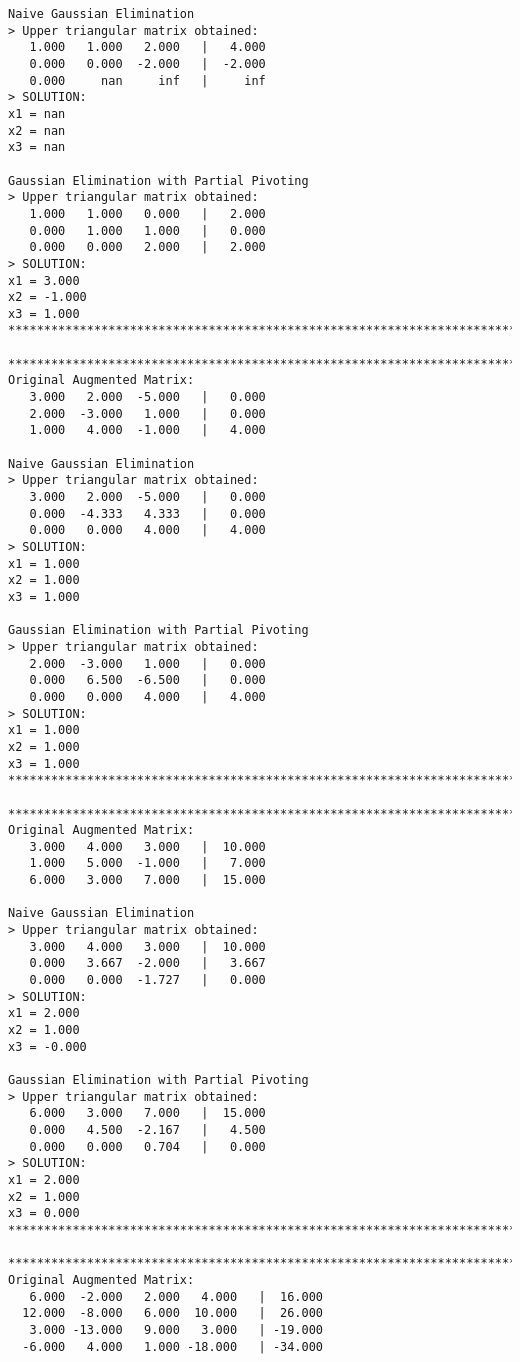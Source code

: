 \documentclass[letterpaper,10pt,titlepage]{report}
\begin{document}
\begin{verbatim}
Naive Gaussian Elimination
> Upper triangular matrix obtained:
   1.000   1.000   2.000   |   4.000
   0.000   0.000  -2.000   |  -2.000
   0.000     nan     inf   |     inf
> SOLUTION:
x1 = nan
x2 = nan
x3 = nan

Gaussian Elimination with Partial Pivoting
> Upper triangular matrix obtained:
   1.000   1.000   0.000   |   2.000
   0.000   1.000   1.000   |   0.000
   0.000   0.000   2.000   |   2.000
> SOLUTION:
x1 = 3.000
x2 = -1.000
x3 = 1.000
********************************************************************************

********************************************************************************
Original Augmented Matrix:
   3.000   2.000  -5.000   |   0.000
   2.000  -3.000   1.000   |   0.000
   1.000   4.000  -1.000   |   4.000

Naive Gaussian Elimination
> Upper triangular matrix obtained:
   3.000   2.000  -5.000   |   0.000
   0.000  -4.333   4.333   |   0.000
   0.000   0.000   4.000   |   4.000
> SOLUTION:
x1 = 1.000
x2 = 1.000
x3 = 1.000

Gaussian Elimination with Partial Pivoting
> Upper triangular matrix obtained:
   2.000  -3.000   1.000   |   0.000
   0.000   6.500  -6.500   |   0.000
   0.000   0.000   4.000   |   4.000
> SOLUTION:
x1 = 1.000
x2 = 1.000
x3 = 1.000
********************************************************************************

********************************************************************************
Original Augmented Matrix:
   3.000   4.000   3.000   |  10.000
   1.000   5.000  -1.000   |   7.000
   6.000   3.000   7.000   |  15.000

Naive Gaussian Elimination
> Upper triangular matrix obtained:
   3.000   4.000   3.000   |  10.000
   0.000   3.667  -2.000   |   3.667
   0.000   0.000  -1.727   |   0.000
> SOLUTION:
x1 = 2.000
x2 = 1.000
x3 = -0.000

Gaussian Elimination with Partial Pivoting
> Upper triangular matrix obtained:
   6.000   3.000   7.000   |  15.000
   0.000   4.500  -2.167   |   4.500
   0.000   0.000   0.704   |   0.000
> SOLUTION:
x1 = 2.000
x2 = 1.000
x3 = 0.000
********************************************************************************

********************************************************************************
Original Augmented Matrix:
   6.000  -2.000   2.000   4.000   |  16.000
  12.000  -8.000   6.000  10.000   |  26.000
   3.000 -13.000   9.000   3.000   | -19.000
  -6.000   4.000   1.000 -18.000   | -34.000


\end{verbatim}
\end{document}
